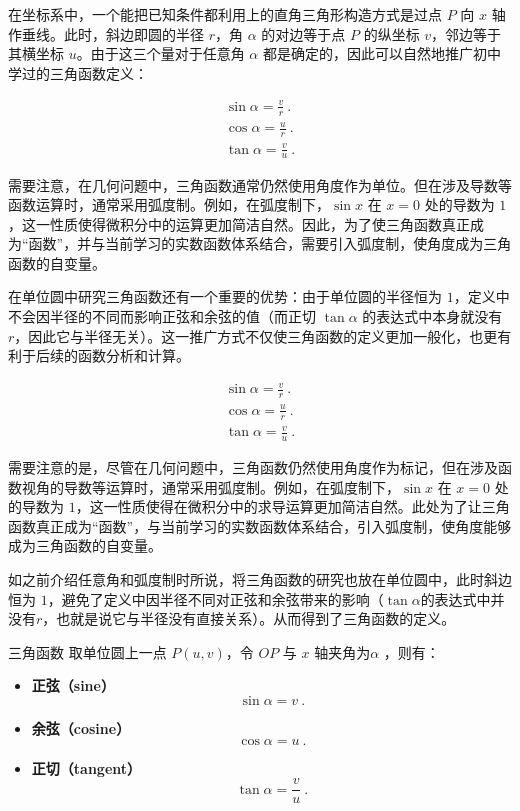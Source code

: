 在坐标系中，一个能把已知条件都利用上的直角三角形构造方式是过点 $P$ 向 $x$ 轴作垂线。此时，斜边即圆的半径 $r$，角 $\alpha$ 的对边等于点 $P$ 的纵坐标 $v$，邻边等于其横坐标 $u$。由于这三个量对于任意角 $\alpha$ 都是确定的，因此可以自然地推广初中学过的三角函数定义：

\begin{gather}
\sin\alpha = \frac{v}{r}~.\\
\cos\alpha = \frac{u}{r}~.\\
\tan\alpha = \frac{v}{u}~.
\end{gather}

需要注意，在几何问题中，三角函数通常仍然使用角度作为单位。但在涉及导数等函数运算时，通常采用弧度制。例如，在弧度制下，$\sin x$ 在 $x=0$ 处的导数为 $1$，这一性质使得微积分中的运算更加简洁自然。因此，为了使三角函数真正成为“函数”，并与当前学习的实数函数体系结合，需要引入弧度制，使角度成为三角函数的自变量。

在单位圆中研究三角函数还有一个重要的优势：由于单位圆的半径恒为 $1$，定义中不会因半径的不同而影响正弦和余弦的值（而正切 $\tan\alpha$ 的表达式中本身就没有 $r$，因此它与半径无关）。这一推广方式不仅使三角函数的定义更加一般化，也更有利于后续的函数分析和计算。



\begin{gather}
\sin\alpha = \frac{v}{r}~.\\
\cos\alpha = \frac{u}{r}~.\\
\tan\alpha = \frac{v}{u}~.
\end{gather}


需要注意的是，尽管在几何问题中，三角函数仍然使用角度作为标记，但在涉及函数视角的导数等运算时，通常采用弧度制。例如，在弧度制下，$\sin x$ 在 $x=0$ 处的导数为 $1$，这一性质使得在微积分中的求导运算更加简洁自然。此处为了让三角函数真正成为“函数”，与当前学习的实数函数体系结合，引入弧度制，使角度能够成为三角函数的自变量。

如之前介绍任意角和弧度制时所说，将三角函数的研究也放在单位圆中，此时斜边恒为 $1$，避免了定义中因半径不同对正弦和余弦带来的影响（$\tan\alpha$的表达式中并没有$r$，也就是说它与半径没有直接关系）。从而得到了三角函数的定义。

\begin{definition}{三角函数}
取单位圆上一点 $P(u,v)$，令 $OP$ 与 $x$ 轴夹角为$\alpha$ ，则有：
\begin{itemize}
\item \textbf{正弦（sine）}
\begin{equation}
\displaystyle\sin \alpha = v~.
\end{equation}
\item \textbf{余弦（cosine）}
\begin{equation}
\displaystyle\cos \alpha = u~.
\end{equation}
\item \textbf{正切（tangent）}
\begin{equation}
\displaystyle\tan \alpha = \frac{v}{u}~.
\end{equation}
\end{itemize}
\end{definition}


